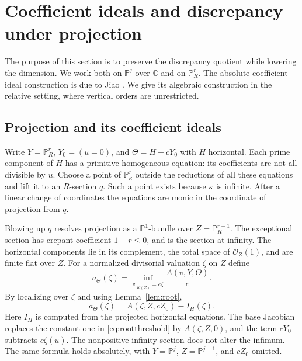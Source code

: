 \documentclass[11pt,reqno]{amsart}
\numberwithin{equation}{section}
\theoremstyle{definition}
\theoremstyle{remark}
\newcommand{\C}{\mathbb C}
\newcommand{\PP}{\mathbb P}
\newcommand{\OO}{\mathcal O}
\begin{document}
\section{Coefficient ideals and discrepancy under projection}\label{sec:projection}

The purpose of this section is to preserve the discrepancy quotient while lowering the dimension. We work both on $\PP^j$ over $\C$ and on $\PP^r_R$. The absolute coefficient-ideal construction is due to Jiao \cite[Proposition~4.3]{Jiao}. We give its algebraic construction in the relative setting, where vertical orders are unrestricted.

\subsection{Projection and its coefficient ideals}
Write $Y=\PP^r_R$, $Y_0=(u=0)$, and $\Theta=H+cY_0$ with $H$ horizontal. Each prime component of $H$ has a primitive homogeneous equation: its coefficients are not all divisible by $u$. Choose a point of $\PP^r_\kappa$ outside the reductions of all these equations and lift it to an $R$-section $q$. Such a point exists because $\kappa$ is infinite. After a linear change of coordinates the equations are monic in the coordinate of projection from $q$.

Blowing up $q$ resolves projection as a $\PP^1$-bundle over $Z=\PP^{r-1}_R$. The exceptional section has crepant coefficient $1-r\le0$, and is the section at infinity. The horizontal components lie in its complement, the total space of $\OO_Z(1)$, and are finite flat over $Z$. For a normalized divisorial valuation $\zeta$ on $Z$ define
\begin{equation}\label{eq:athreshold}
 a_\Theta(\zeta)=\inf_{v|_{K(Z)}=e\zeta}
 \frac{A(v,Y,\Theta)}e.
\end{equation}
By localizing over $\zeta$ and using Lemma~\ref{lem:root},
\begin{equation}\label{eq:rootbase}
 a_\Theta(\zeta)=A(\zeta,Z,cZ_0)-I_H(\zeta).
\end{equation}
Here $I_H$ is computed from the projected horizontal equations. The base Jacobian replaces the constant one in \eqref{eq:rootthreshold} by $A(\zeta,Z,0)$, and the term $cY_0$ subtracts $c\zeta(u)$. The nonpositive infinity section does not alter the infimum. The same formula holds absolutely, with $Y=\PP^j$, $Z=\PP^{j-1}$, and $cZ_0$ omitted.
\end{document}
